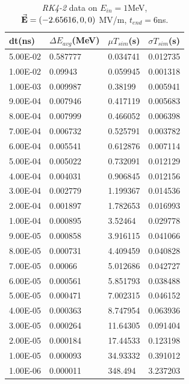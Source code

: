 \documentclass[a4paper,oneside,12pt]{report}
\numberwithin{equation}{chapter}
\begin{document}
\begin{table}[H]
    \centering
    \caption{\textit{RK4-2} data on $E_{in}=1$MeV, $\vec{\textbf{E}}=(-2.65616, 0, 0)$ MV/m, $t_{end}=6$ns.}
    \vspace{10pt}
    \begin{tabular}{|l|l|l|l|}
    \hline
    dt(ns)       & $\Delta E_{avg}$(MeV) & $\mu T_{sim}$(s)    & $\sigma T_{sim}$(s) \\\hline
        5.00E-02 & 0.587777     & 0.034741 & 0.012735 \\\hline
        1.00E-02 & 0.09943      & 0.059945 & 0.001318 \\\hline
        1.00E-03 & 0.009987     & 0.38199  & 0.005941 \\\hline
        9.00E-04 & 0.007946     & 0.417119 & 0.005683 \\\hline
        8.00E-04 & 0.007999     & 0.466052 & 0.006398 \\\hline
        7.00E-04 & 0.006732     & 0.525791 & 0.003782 \\\hline
        6.00E-04 & 0.005541     & 0.612876 & 0.007114 \\\hline
        5.00E-04 & 0.005022     & 0.732091 & 0.012129 \\\hline
        4.00E-04 & 0.004031     & 0.906845 & 0.012156 \\\hline
        3.00E-04 & 0.002779     & 1.199367 & 0.014536 \\\hline
        2.00E-04 & 0.001897     & 1.782653 & 0.016993 \\\hline
        1.00E-04 & 0.000895     & 3.52464  & 0.029778 \\\hline
        9.00E-05 & 0.000858     & 3.916115 & 0.041066 \\\hline
        8.00E-05 & 0.000731     & 4.409459 & 0.040828 \\\hline
        7.00E-05 & 0.00066      & 5.012686 & 0.042727 \\\hline
        6.00E-05 & 0.000561     & 5.851793 & 0.038488 \\\hline
        5.00E-05 & 0.000471     & 7.002315 & 0.046152 \\\hline
        4.00E-05 & 0.000363     & 8.747954 & 0.063936 \\\hline
        3.00E-05 & 0.000264     & 11.64305 & 0.091404 \\\hline
        2.00E-05 & 0.000184     & 17.44533 & 0.123198 \\\hline
        1.00E-05 & 0.000093     & 34.93332 & 0.391012 \\\hline
        1.00E-06 & 0.000011     & 348.494  & 3.237203 \\\hline
    \end{tabular}
    \label{tab:rk2_statE90_table}
\end{table}
\end{document}
